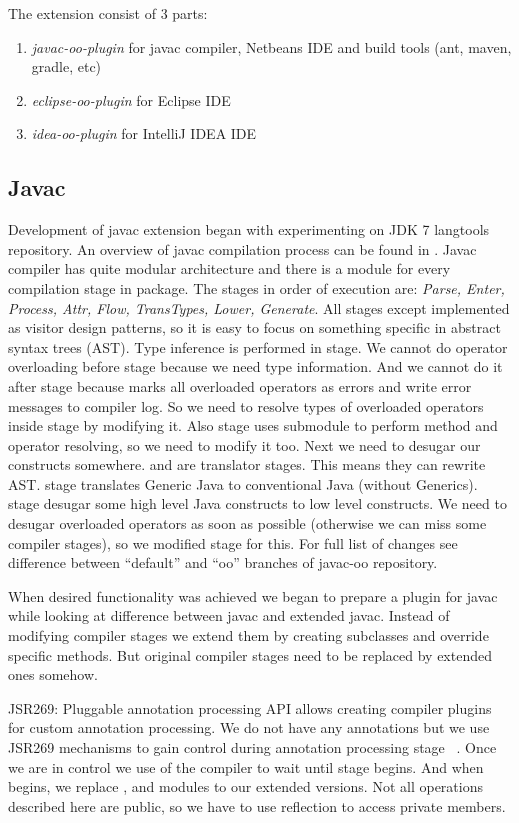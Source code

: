 \documentclass{aircc}
\begin{document}
The extension consist of 3 parts:
\begin{enumerate}
\item \textit{javac-oo-plugin} for javac compiler, Netbeans IDE and build tools (ant, maven, gradle, etc)
\item \textit{eclipse-oo-plugin} for Eclipse IDE
\item \textit{idea-oo-plugin} for IntelliJ IDEA IDE
\end{enumerate}

\subsection{Javac\label{javac}}
Development of javac extension began with experimenting on JDK 7 langtools repository\cite{javac-oo}.
An overview of javac compilation process can be found in \cite{HackerGuideJavac}.
Javac compiler has quite modular architecture and there is a module for every compilation stage in  package.
The stages in order of execution are: \textit{Parse, Enter, Process, Attr, Flow, TransTypes, Lower, Generate}.
All stages except  implemented as visitor design patterns, so it is easy to focus on something specific in abstract syntax trees (AST).
Type inference is performed in  stage.
We cannot do operator overloading before  stage because we need type information. 
And we cannot do it after  stage because  marks all overloaded operators as errors and write error messages to compiler log.
So we need to resolve types of overloaded operators inside  stage by modifying it. 
Also  stage uses  submodule to perform method and operator resolving, so we need to modify it too.
Next we need to desugar our constructs somewhere.
 and  are translator stages. This means they can rewrite AST.
 stage translates Generic Java to conventional Java (without Generics).
 stage desugar some high level Java constructs to low level constructs.
We need to desugar overloaded operators as soon as possible (otherwise we can miss some compiler stages), 
so we modified  stage for this.
For full list of changes see difference between ``default'' and ``oo'' branches of javac-oo repository\cite{javac-oo}.

When desired functionality was achieved we began to prepare a plugin for javac while looking at difference between javac and extended javac.
Instead of modifying compiler stages we extend them by creating subclasses and override specific methods.
But original compiler stages need to be replaced by extended ones somehow.

JSR269: Pluggable annotation processing API\cite{jsr269} allows creating compiler plugins for custom annotation processing.
We do not have any annotations but we use JSR269 mechanisms to gain control during annotation processing stage \textemdash~.
Once we are in control we use  of the compiler to wait until  stage begins.
And when  begins, we replace ,  and  modules to our extended versions.
Not all operations described here are public, so we have to use reflection to access private members.
\end{document}
